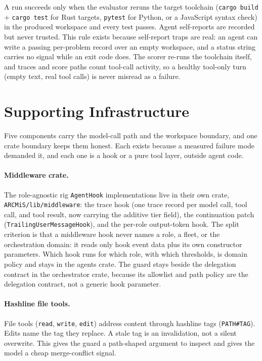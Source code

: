 \documentclass[11pt]{article}
\begin{document}
A run succeeds only when the evaluator reruns the target toolchain
(\texttt{cargo build} + \texttt{cargo test} for Rust targets,
\texttt{pytest} for Python, or a JavaScript syntax check) in the produced
workspace and every test passes. Agent self-reports are recorded but
never trusted. This rule exists because self-report traps are real:
an agent can write a passing per-problem record over an empty
workspace, and a status string carries no signal while an exit code
does. The scorer re-runs the
toolchain itself, and traces and score paths count tool-call activity, so
a healthy tool-only turn (empty text, real tool calls) is never misread
as a failure.

\section{Supporting Infrastructure}
\label{sec:infra}

Five components carry the model-call path and the workspace boundary,
and one crate boundary keeps them honest. Each exists because a measured
failure mode demanded it, and each one is a hook or a pure tool layer,
outside agent code.

\paragraph{Middleware crate.}
The role-agnostic rig \texttt{AgentHook} implementations live in their
own crate, \texttt{ARCMiS/lib/middleware}: the trace hook (one trace
record per model call, tool call, and tool result, now carrying the
additive tier field), the continuation patch
(\texttt{TrailingUserMessageHook}), and the per-role output-token hook.
The split criterion is that a middleware hook never names a role, a
fleet, or the orchestration domain: it reads only hook event data plus
its own constructor parameters. Which hook runs for which role, with
which thresholds, is domain policy and stays in the agents crate. The
guard stays beside the delegation contract in the orchestrator crate,
because its allowlist and path policy are the delegation contract, not a
generic hook parameter.

\paragraph{Hashline file tools.}
File tools (\texttt{read}, \texttt{write}, \texttt{edit}) address content
through hashline tags (\texttt{PATH\#TAG}). Edits name the tag they
replace. A stale tag is an invalidation, not a silent overwrite. This
gives the guard a path-shaped argument to inspect and gives the model a
cheap merge-conflict signal.
\end{document}
